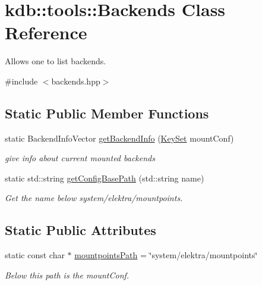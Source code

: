 \hypertarget{classkdb_1_1tools_1_1Backends}{\section{kdb\-:\-:tools\-:\-:Backends Class Reference}
\label{classkdb_1_1tools_1_1Backends}
}


Allows one to list backends.  




{\ttfamily \#include $<$backends.\-hpp$>$}

\subsection*{Static Public Member Functions}
\begin{DoxyCompactItemize}
\item 
static Backend\-Info\-Vector \hyperlink{classkdb_1_1tools_1_1Backends_a82b334d8a1e01df664462c6dd43bd7e1}{get\-Backend\-Info} (\hyperlink{classkdb_1_1KeySet}{Key\-Set} mount\-Conf)
\begin{DoxyCompactList}\small\item\em give info about current mounted backends \end{DoxyCompactList}\item 
static std\-::string \hyperlink{classkdb_1_1tools_1_1Backends_a4276c15607c61bb9feecbf5ab5c50c67}{get\-Config\-Base\-Path} (std\-::string name)
\begin{DoxyCompactList}\small\item\em Get the name below system/elektra/mountpoints. \end{DoxyCompactList}\end{DoxyCompactItemize}
\subsection*{Static Public Attributes}
\begin{DoxyCompactItemize}
\item 
\hypertarget{classkdb_1_1tools_1_1Backends_ac867850accaab4fda286f763cacc3926}{static const char $\ast$ \hyperlink{classkdb_1_1tools_1_1Backends_ac867850accaab4fda286f763cacc3926}{mountpoints\-Path} = \char`\"{}system/elektra/mountpoints\char`\"{}}\label{classkdb_1_1tools_1_1Backends_ac867850accaab4fda286f763cacc3926}

\begin{DoxyCompactList}\small\item\em Below this path is the mount\-Conf. \end{DoxyCompactList}\end{DoxyCompactItemize}



